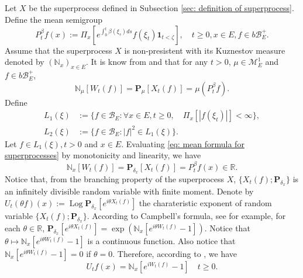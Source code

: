\documentclass[12pt]{amsart}
\theoremstyle{plain}
\theoremstyle{definition}
\numberwithin{equation}{section}
\begin{document}
\subsection{}
\label{sec: definition of vf}
    Let $X$ be the superprocess defined in Subsection \ref{sec: definition of superprocess}.
    Define the mean semigroup
\begin{equation}
    P_t^\beta f(x)
    := \Pi_{x}[e^{\int_0^t \beta(\xi_s)ds}f(\xi_t) \mathbf 1_{t< \zeta}],
    \quad t\geq 0, x\in E, f\in b\mathscr B^+_E.
\end{equation}
    Assume that the superprocess $X$ is non-presistent with its Kuznestov measure denoted by $(\mathbb N_x)_{x\in E}$.
    It is know from \cite[Proposition 2.27]{Li2011Measure-valued} and \cite[Theorem 2.7]{Kyprianou2014Fluctuations} that for any $t > 0$, $\mu \in \mathcal M_E^1$ and $f\in b\mathscr B^+_E$,
\begin{equation}
\label{eq: mean formula for superprocesses}
    \mathbb N_{\mu}[W_t(f)]
    =\mathbf P_{\mu}[X_t(f)]=\mu(P^\beta_t f).
\end{equation}
    Define
\begin{align}
    L_1(\xi)
    &:= \{f\in \mathscr B_E: \forall x\in E, t\geq 0, \quad \Pi_x[|f(\xi_t)|]< \infty\},
    \\L_2(\xi)
    &:= \{f \in \mathscr B_E: |f|^2 \in L_1(\xi)\}.
\end{align}
    Let $f\in L_1(\xi), t >0$ and $x\in E$.
    Evaluating \eqref{eq: mean formula for superprocesses} by monotonicity and linearity, we have
\begin{equation}
    \mathbb N_x[W_t(f)]
    =\mathbf P_{\delta_x}[X_t(f)]=P^\beta_t f(x) \in \mathbb R.
\end{equation}
    Notice that, from the branching property of the superprocess $X$, $\{X_t(f); \mathbf P_{\delta_x}\}$ is an infinitely divisible random variable with finite moment.
    Denote by $U_t(\theta f)(x) := \operatorname{Log} \mathbf P_{\delta_x}[e^{i \theta X_t(f)}]$  the charateristic exponent of random variable $\{X_t(f); \mathbf P_{\delta_x}\}$.
    According to Campbell's formula, see \cite[Theorem 2.7]{Kyprianou2014Fluctuations} for example, for each $\theta \in \mathbb R$,
$   \mathbf P_{\delta_x} [e^{i\theta X_t(f)}]
    = \exp(\mathbb N_x[ e^{i\theta W_t(f)} - 1]).
$
    Notice that $\theta \mapsto \mathbb N_x[e^{i\theta W_t(f)} - 1]$ is a continuous function.
    Also notice that $\mathbb N_x[e^{i\theta W_t(f)} - 1] = 0$ if $\theta = 0$.
    Therefore, according to \cite[Lemma 7.6]{Sato1999Levy}, we have
\begin{equation}
\label{eq: N and characteristic exponent}
    U_tf(x) = \mathbb N_x[e^{i W_t(f)} - 1]
    \quad t \geq 0.
\end{equation}
\end{document}
